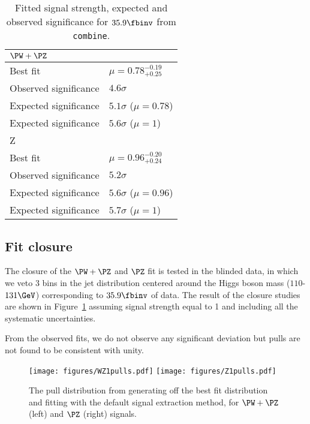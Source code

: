 \begin{table}[htbp]
\centering
\begin{tabular}{ll}
\hline\hline
$\PW+\PZ$ & \\
\hline\hline
Best fit   & $\mu =0.78^{-0.19}_{+0.25}$ \\
Observed significance & $4.6\sigma$ \\
Expected significance & $5.1\sigma$ ($\mu=0.78$)\\
Expected significance & $5.6\sigma$ ($\mu=1$)\\
\hline\hline
Z & \\
\hline\hline
Best fit   & $\mu =0.96^{-0.20}_{+0.24}$ \\
Observed significance & $5.2\sigma$ \\
Expected significance & $5.6\sigma$ ($\mu=0.96$)\\
Expected significance & $5.7\sigma$ ($\mu=1$)\\
\hline\hline

\end{tabular}
\caption{Fitted signal strength, expected and observed significance for $35.9\fbinv$ from
  \texttt{combine}.
\label{tab:expectedSig}}
\end{table}
\clearpage


\subsection{Fit closure}
The closure of the $\PW+\PZ$ and $\PZ$ fit is tested in the blinded data, in which we veto
3 bins in the jet \mSD distribution centered around the Higgs boson
mass ($110$-$131\GeV$) corresponding to $35.9\fbinv$ of data.  The result of the closure
studies are shown in Figure~\ref{fig:pullDataWZ} assuming signal strength equal to 1 and including all the systematic uncertainties.

From the observed fits, we do not observe
any significant deviation but pulls are not found to be consistent with unity.

\begin{figure}[hbtp]
\centering
\texttt{[image: figures/WZ1pulls.pdf]}
\texttt{[image: figures/Z1pulls.pdf]}\\
 \caption{The pull distribution from generating off the best fit distribution and fitting with the default signal extraction method, for $\PW+\PZ$ (left) and $\PZ$ (right) signals.}

 \label{fig:pullDataWZ}
 \end{figure}

